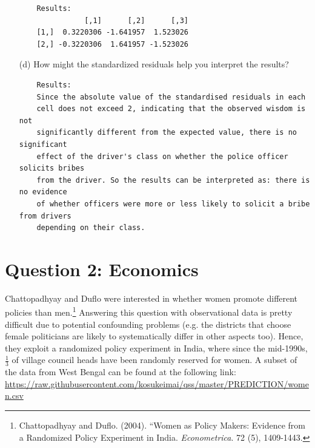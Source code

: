\documentclass[12pt,letterpaper]{article}
\begin{document}
\begin{enumerate}
	
	
	\begin{verbatim} 
	Results:
	           [,1]      [,2]      [,3]
	[1,]  0.3220306 -1.641957  1.523026
	[2,] -0.3220306  1.641957 -1.523026
	\end{verbatim}	
	
	\vspace{1cm}
	\item [(d)] How might the standardized residuals help you interpret the results?  
	
	\begin{verbatim} 
	Results: 
	Since the absolute value of the standardised residuals in each 
	cell does not exceed 2, indicating that the observed wisdom is not 
	significantly different from the expected value, there is no significant 
	effect of the driver's class on whether the police officer solicits bribes 
	from the driver. So the results can be interpreted as: there is no evidence 
	of whether officers were more or less likely to solicit a bribe from drivers 
	depending on their class.
	\end{verbatim}	
	
\end{enumerate}
\newpage

\section*{Question 2: Economics}
Chattopadhyay and Duflo were interested in whether women promote different policies than men.\footnote{Chattopadhyay and Duflo. (2004). ``Women as Policy Makers: Evidence from a Randomized Policy Experiment in India. \textit{Econometrica}. 72 (5), 1409-1443.} Answering this question with observational data is pretty difficult due to potential confounding problems (e.g. the districts that choose female politicians are likely to systematically differ in other aspects too). Hence, they exploit a randomized policy experiment in India, where since the mid-1990s, $\frac{1}{3}$ of village council heads have been randomly reserved for women. A subset of the data from West Bengal can be found at the following link: \url{https://raw.githubusercontent.com/kosukeimai/qss/master/PREDICTION/women.csv}\\
\end{document}
